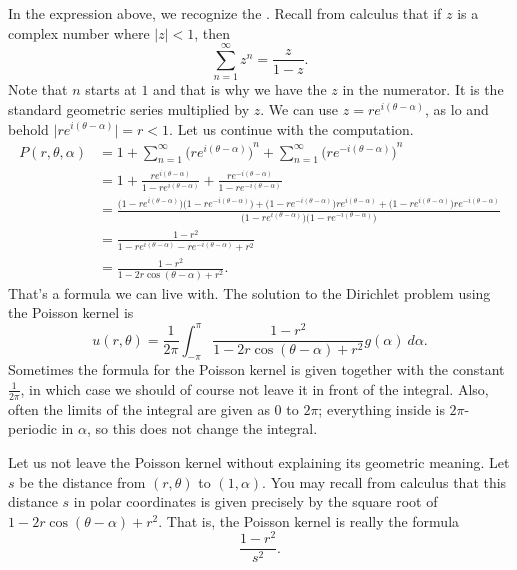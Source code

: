 \documentclass{ximera}
\begin{document}
In the expression above, we recognize the \emph{}. Recall from calculus that if $z$ is a complex number where $\lvert z \rvert < 1$, then
\begin{equation*}
    \sum_{n=1}^\infty z^n = \frac{z}{1-z} .
\end{equation*}
Note that $n$ starts at $1$ and that is why we have the $z$ in the numerator. It is the standard geometric series multiplied by $z$. We can use $z = re^{i(\theta-\alpha)}$, as lo and behold $\lvert re^{i(\theta-\alpha)} \rvert = r < 1$. Let us continue with the computation.
\begin{equation*}
    \begin{split}
        P(r,\theta,\alpha)& = 1 + \sum_{n=1}^\infty {\bigl( re^{i(\theta-\alpha)}\bigr)}^{n} + \sum_{n=1}^\infty {\bigl( re^{-i(\theta-\alpha)}\bigr)}^{n} \\
        & = 1 + \frac{re^{i(\theta-\alpha)}}{1-re^{i(\theta-\alpha)}} + \frac{re^{-i(\theta-\alpha)}}{1-re^{-i(\theta-\alpha)}}\\
        & = \frac{
            \bigl(1-re^{i(\theta-\alpha)}\bigr)\bigl(1-re^{-i(\theta-\alpha)}\bigr) + \bigl(1-re^{-i(\theta-\alpha)}\bigr)re^{i(\theta-\alpha)} + \bigl(1-re^{i(\theta-\alpha)}\bigr)re^{-i(\theta-\alpha)}
            } {
            \bigl(1-re^{i(\theta-\alpha)}\bigr)\bigl(1-re^{-i(\theta-\alpha)}\bigr)
            }\\
        & = \frac{1 -r^2}{1 - re^{i(\theta-\alpha)} - re^{-i(\theta-\alpha)} +r^2}\\
        & = \frac{1 -r^2}{1 - 2r\cos(\theta-\alpha) +r^2} .
    \end{split}
\end{equation*}
That's a formula we can live with.  The solution to the Dirichlet problem using the Poisson kernel is
\begin{equation*}
    u(r,\theta) = \frac{1}{2\pi} \int_{-\pi}^{\pi} \frac{1 -r^2}{1 - 2r\cos(\theta-\alpha) +r^2} g(\alpha) ~ d\alpha .
\end{equation*}
Sometimes the formula for the Poisson kernel is given together with the constant $\frac{1}{2\pi}$, in which case we should of course not leave it in front of the integral. Also, often the limits of the integral are given as 0 to $2\pi$; everything inside is $2\pi$-periodic in $\alpha$, so this does not change the integral.

\begin{mywrapfigsimp}[12]{2.1in}{2.4in}
    \diffypdfversion{\vspace*{5pt}}
    \noindent
    
\end{mywrapfigsimp}
Let us not leave the Poisson kernel without explaining its geometric meaning.  Let $s$ be the distance from $(r,\theta)$ to $(1,\alpha)$. You may recall from calculus that this distance $s$ in polar coordinates is given precisely by the square root of $1 - 2r\cos(\theta-\alpha) +r^2$.  That is, the Poisson kernel is really the formula
\begin{equation*}
    \frac{1-r^2}{s^2} .
\end{equation*}
\end{document}
